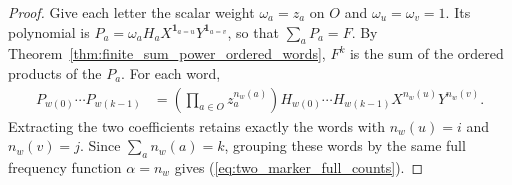 \begin{proof}
    \leanok
    Give each letter the scalar weight $\omega_a=z_a$ on $O$ and
    $\omega_u=\omega_v=1$. Its polynomial is
    $P_a=\omega_aH_aX^{\mathbf1_{a=u}}Y^{\mathbf1_{a=v}}$, so that
    $\sum_aP_a=F$. By Theorem~\ref{thm:finite_sum_power_ordered_words},
    $F^k$ is the sum of the ordered products of the $P_a$. For each word,
    \begin{align}
        P_{w(0)}\cdots P_{w(k-1)}
         & =\left(\prod_{a\in O}z_a^{n_w(a)}\right)
        H_{w(0)}\cdots H_{w(k-1)}X^{n_w(u)}Y^{n_w(v)}.
    \end{align}
    Extracting the two coefficients retains exactly the words with
    $n_w(u)=i$ and $n_w(v)=j$. Since $\sum_a n_w(a)=k$, grouping these
    words by the same full frequency function $\alpha=n_w$ gives
    (\ref{eq:two_marker_full_counts}).
\end{proof}
